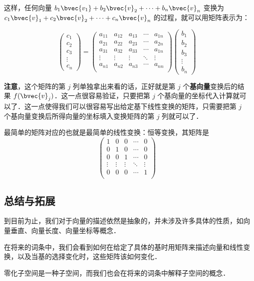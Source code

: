这样，任何向量 $b_1\bvec{v_1}+b_2\bvec{v}_2+\cdots+b_n\bvec{v}_n$ 变换为 $c_1\bvec{v}_1+c_2\bvec{v}_2+\cdots+c_n\bvec{v}_n$ 的过程，就可以用矩阵表示为：

\begin{equation}
\begin{pmatrix}
c_1\\c_2\\c_3\\\vdots\\c_n
\end{pmatrix}
=
    \begin{pmatrix}
    a_{11}&a_{12}&a_{13}&\cdots&a_{1n}\\
    a_{21}&a_{22}&a_{23}&\cdots&a_{2n}\\
    a_{31}&a_{32}&a_{33}&\cdots&a_{1n}\\
    \vdots&\vdots&\vdots&\ddots&\vdots\\
    a_{n1}&a_{n2}&a_{n3}&\cdots&a_{nn}\\
    \end{pmatrix}
    \begin{pmatrix}
    b_1\\b_2\\b_3\\\vdots\\b_n
    \end{pmatrix}
\end{equation}

\textbf{注意}，这个矩阵的第 $j$ 列单独拿出来看的话，正好就是第 $j$ 个\textbf{基向量}变换后的结果 $f(\bvec{v}_j)$．这一点很容易验证，只要把第 $j$ 个基向量的坐标代入计算就可以了．这一点使得我们可以很容易写出给定基下线性变换的矩阵，只需要把第 $j$ 个基向量变换后所得向量的坐标填入变换矩阵的第 $j$ 列就可以了．

最简单的矩阵对应的也就是最简单的线性变换：恒等变换，其矩阵是
\begin{equation}
    \begin{pmatrix}
1&0&0&\cdots&0\\
0&1&0&\cdots&0\\
0&0&1&\cdots&0\\
\vdots&\vdots&\vdots&\ddots&\vdots\\
0&0&0&\cdots&1\\
    \end{pmatrix}
\end{equation}


\subsection{总结与拓展}

到目前为止，我们对于向量的描述依然是抽象的，并未涉及许多具体的性质，如向量垂直、向量长度、向量坐标等概念．

在将来的词条中，我们会看到如何在给定了具体的基时用矩阵来描述向量和线性变换，以及当基的选择变化时，这些矩阵该如何变化．

零化子空间是一种子空间，而我们也会在将来的词条中解释子空间的概念．
